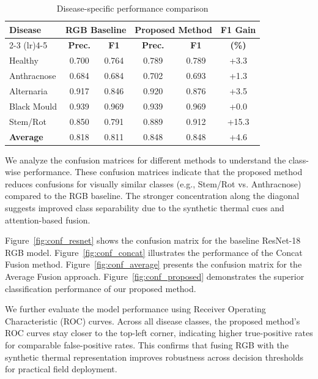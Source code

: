 \documentclass[utf8]{FrontiersinHarvard} %
\begin{document}
\begin{table}[h!]
    \caption{Disease-specific performance comparison}
    \label{tab:perclass}
    \raggedright
    \scriptsize
    \begin{tabular}{lccccc}
        \toprule
        \multirow{2}{*}{\textbf{Disease}} & \multicolumn{2}{c}{\textbf{RGB Baseline}} & \multicolumn{2}{c}{\textbf{Proposed Method}} & \textbf{F1 Gain} \\
        \cmidrule(lr){2-3} \cmidrule(lr){4-5}
         & \textbf{Prec.} & \textbf{F1} & \textbf{Prec.} & \textbf{F1} & \textbf{(\%)} \\
        \midrule
        Healthy & 0.700 & 0.764 & 0.789 & 0.789 & +3.3 \\
        Anthracnose & 0.684 & 0.684 & 0.702 & 0.693 & +1.3 \\
        Alternaria & 0.917 & 0.846 & 0.920 & 0.876 & +3.5 \\
        Black Mould & 0.939 & 0.969 & 0.939 & 0.969 & +0.0 \\
        Stem/Rot & 0.850 & 0.791 & 0.889 & 0.912 & +15.3 \\
        \midrule
        \textbf{Average} & 0.818 & 0.811 & 0.848 & 0.848 & +4.6 \\
        \bottomrule
    \end{tabular}
\end{table}

\noindent We analyze the confusion matrices for different methods to understand the class-wise performance.
These confusion matrices indicate that the proposed method reduces confusions for visually similar classes (e.g., Stem/Rot vs. Anthracnose) compared to the RGB baseline.
The stronger concentration along the diagonal suggests improved class separability due to the synthetic thermal cues and attention-based fusion.

Figure~\ref{fig:conf_resnet} shows the confusion matrix for the baseline ResNet-18 RGB model.
Figure~\ref{fig:conf_concat} illustrates the performance of the Concat Fusion method.
Figure~\ref{fig:conf_average} presents the confusion matrix for the Average Fusion approach.
Figure~\ref{fig:conf_proposed} demonstrates the superior classification performance of our proposed method.

\noindent We further evaluate the model performance using Receiver Operating Characteristic (ROC) curves.
Across all disease classes, the proposed method’s ROC curves stay closer to the top-left corner, indicating higher true-positive rates for comparable false-positive rates.
This confirms that fusing RGB with the synthetic thermal representation improves robustness across decision thresholds for practical field deployment.
\end{document}
